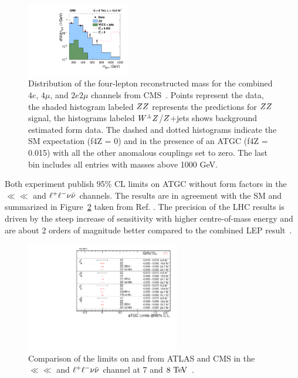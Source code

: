 \begin{figure}[htbp]
  \begin{center}
  \includegraphics[width=0.4\textwidth]{figures/sss-inclboson-diboson-zzprod-zzinvmass.pdf}
  \caption{ Distribution of the four-lepton reconstructed mass for the combined $4e$, $4\mu$, and $2e2\mu$ channels from CMS~\cite{CMS:2014xja}. Points represent the data, the shaded histogram labeled $ZZ$ represents the predictions for $ZZ$ signal, the histograms labeled $W^{\pm}Z$/$Z$+jets shows background estimated form data. The dashed and dotted histograms indicate the SM expectation (f4Z = 0) and in the presence of an ATGC (f4Z = 0.015) with all the other anomalous couplings set to zero. The last bin includes all entries with masses above 1000 GeV.
}
\label{fig:sss-inclboson-diboson-zzprod-zzinvmass}
\end{center}
\end{figure}

Both experiment publish 95\% CL limits on ATGC without form factors in the $\ll\ll$ 
and $\ell^+ \ell^-\nu\bar{\nu}$ channels. The results are in agreement with the SM and 
summarized in Figure~\ref{fig:sss-inclboson-diboson-zzprod-aTGC_naTGCf} 
taken from Ref. \cite{aTGCplots}. The precision of the LHC results is driven by the steep increase of 
sensitivity with higher centre-of-mass energy
and are about 2 orders of magnitude better compared to the 
combined LEP result~\cite{LEP-comb-2002}.  
\begin{figure}[htbp]
  \begin{center}
  \includegraphics[width=0.6\textwidth]{figures/sss-inclboson-diboson-zzprod-aTGC_naTGCf.pdf}
  \caption{ Comparison of the limits on \ffourv{} and \ffivev{} from ATLAS and CMS in the $\ll\ll$ and $\ell^+ \ell^-\nu\bar{\nu}$
  channel at 7 and $8\TeV$~\cite{aTGCplots}.}
\label{fig:sss-inclboson-diboson-zzprod-aTGC_naTGCf}
\end{center}
\end{figure}







